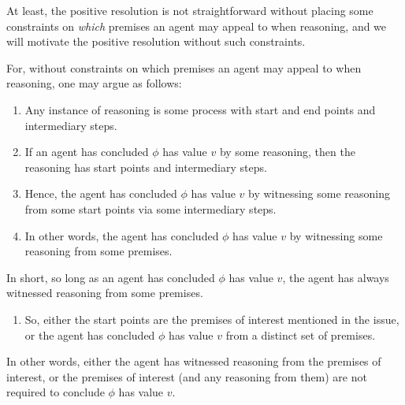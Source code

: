 \begin{note}
  At least, the positive resolution is not straightforward without placing some constraints on \emph{which} premises an agent may appeal to when reasoning, and we will motivate the positive resolution without such constraints.

  For, without constraints on which premises an agent may appeal to when reasoning, one may argue as follows:
  \begin{enumerate}
  \item Any instance of reasoning is some process with start and end points and intermediary steps.
  \item If an agent has concluded \(\phi\) has value \(v\) by some reasoning, then the reasoning has start points and intermediary steps.
  \item Hence, the agent has concluded \(\phi\) has value \(v\) by witnessing some reasoning from some start points via some intermediary steps.
  \item In other words, the agent has concluded \(\phi\) has value \(v\) by witnessing some reasoning from some premises.
  \end{enumerate}

  In short, so long as an agent has concluded \(\phi\) has value \(v\), the agent has always witnessed reasoning from some premises.

  \begin{enumerate}[resume]
  \item So, either the start points are the premises of interest mentioned in the issue, or the agent has concluded \(\phi\) has value \(v\) from a distinct set of premises.
  \end{enumerate}

  In other words, either the agent has witnessed reasoning from the premises of interest, or the premises of interest (and any reasoning from them) are not required to conclude \(\phi\) has value \(v\).
\end{note}

